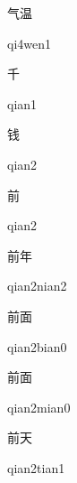 \begin{multicols*}{2}
\begin{verbete}[qi4wen1]{气温}
\begin{pronuncia}{qi4wen1}
\end{pronuncia}
\end{verbete}

\begin{verbete}[qian1]{千}
\begin{pronuncia}{qian1}
\end{pronuncia}
\end{verbete}

\begin{verbete}[qian2]{钱}
\begin{pronuncia}{qian2}
\end{pronuncia}
\end{verbete}

\begin{verbete}[qian2]{前}
\begin{pronuncia}{qian2}
\end{pronuncia}
\end{verbete}

\begin{verbete}{前年}
\begin{pronuncia}{qian2nian2}
\end{pronuncia}
\end{verbete}

\begin{verbete}{前面}
\begin{pronuncia}{qian2bian0}
\end{pronuncia}
\end{verbete}

\begin{verbete}{前面}
\begin{pronuncia}{qian2mian0}
\end{pronuncia}
\end{verbete}

\begin{verbete}{前天}
\begin{pronuncia}{qian2tian1}
\end{pronuncia}
\end{verbete}


\end{multicols*}

